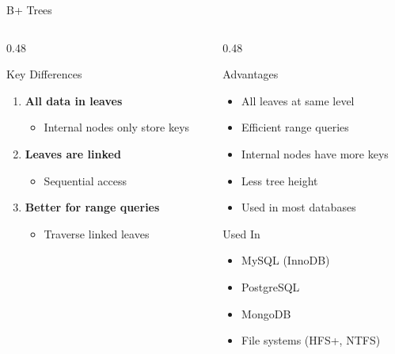 \documentclass[aspectratio=169,xcolor=dvipsnames]{beamer}
\begin{document}
\begin{frame}{B+ Trees}
  \begin{columns}
    \begin{column}{0.48\textwidth}
      \begin{block}{Key Differences}
        \begin{enumerate}
          \item \textbf{All data in leaves}
          \begin{itemize}
            \item Internal nodes only store keys
          \end{itemize}
          \item \textbf{Leaves are linked}
          \begin{itemize}
            \item Sequential access
          \end{itemize}
          \item \textbf{Better for range queries}
          \begin{itemize}
            \item Traverse linked leaves
          \end{itemize}
        \end{enumerate}
      \end{block}
    \end{column}
    \begin{column}{0.48\textwidth}
      \begin{block}{Advantages}
        \begin{itemize}
          \item All leaves at same level
          \item Efficient range queries
          \item Internal nodes have more keys
          \item Less tree height
          \item Used in most databases
        \end{itemize}
      \end{block}

      \begin{exampleblock}{Used In}
        \begin{itemize}
          \item MySQL (InnoDB)
          \item PostgreSQL
          \item MongoDB
          \item File systems (HFS+, NTFS)
        \end{itemize}
      \end{exampleblock}
    \end{column}
  \end{columns}
\end{frame}
\end{document}
